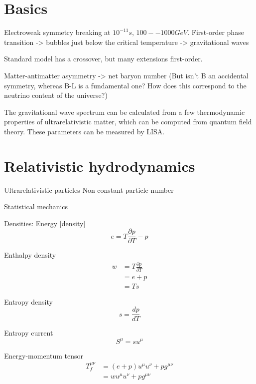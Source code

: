 \section{Basics}
Electroweak symmetry breaking at $10^{-11} s$, $100 -- 1000 GeV$.
First-order phase transition
-> bubbles just below the critical temperature
-> gravitational waves

Standard model has a crossover, but many extensions first-order.

Matter-antimatter asymmetry -> net baryon number
(But isn't B an accidental symmetry, whereas B-L is a fundamental one?
How does this correspond to the neutrino content of the universe?)
\cite{lecture_notes}

The gravitational wave spectrum can be calculated from a few thermodynamic properties of ultrarelativistic matter, which can be computed from quantum field theory.
These parameters can be measured by LISA.

\section{Relativistic hydrodynamics}
Ultrarelativistic particles
Non-constant particle number

Statistical mechanics \cite{huang_statistical_1987}
\cite{schroeder_introduction_2000}
\cite[ch. 4]{lecture_notes}

Densities:
Energy [density]
\begin{equation}
e = T \frac{\partial p}{\partial T} - p
\end{equation}

Enthalpy density
\begin{align}
w
&= T \frac{\partial p}{\partial T} \\
&= e+p \\
&= Ts
\end{align}

Entropy density
\begin{equation}
s = \frac{dp}{dT}
\end{equation}

Entropy current
\begin{equation}
S^\mu = su^\mu
\end{equation}
\cite[p. 23]{lecture_notes}

Energy-momentum tensor
\cites[eq. 5.23]{lecture_notes}[eq. 3]{giese_2020}
\begin{align}
T^{\mu \nu}_f
&= (e+p) u^\mu u^\nu + p g^{\mu \nu} \\
&= w u^\mu u^\nu + p g^{\mu \nu}
\end{align}

